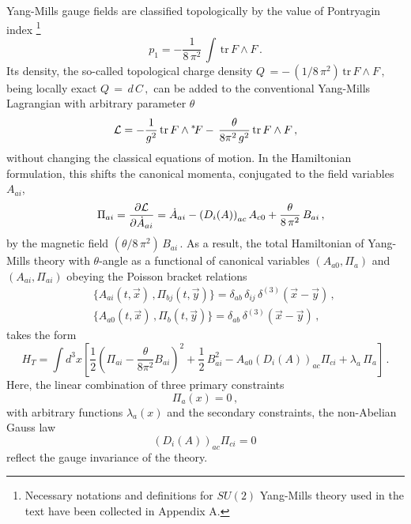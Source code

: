 \documentclass[a4paper,12pt]{article}
\begin{document}
Yang-Mills gauge fields are classified topologically by the
value of Pontryagin index
\footnote{Necessary notations and definitions for $SU(2)$ Yang-Mills
theory used in the text have been collected in Appendix A.}
\begin{equation}
p_1 = - \frac{1}{8 \, \pi^2} \, \int \, \mbox{tr} \, F \wedge F \,.
\end{equation}
Its density, the so-called topological charge density
$
Q\, = -\, (1/ 8 \, \pi^2)\, \mbox{tr} \, F \wedge F\,,
$
being locally exact
$ Q \, = \, d\,C\,, $
can be added to the conventional Yang-Mills Lagrangian
with arbitrary parameter $\theta$
\begin{equation}
\label{eq:Lagr}
{\cal L}  =  - \frac{1}{g^2}  \, \mbox{tr} \, F \wedge {}^\ast\! F -
\, \frac{\theta}{8\pi^2\, g^2} \, \mbox{tr} \, F \wedge F \,,
\end{equation}
without changing the classical equations of motion.
In the Hamiltonian formulation, this
shifts the canonical momenta,
conjugated to the field variables $A_{ai}$,
\begin{eqnarray} \label{eq:mom}
&&  \Pi_{ai} =
\frac{ \partial{\cal L} }{\partial {\dot A}_{ai} } =
{\dot A}_{ai} - \left( D_i (A) \right)_{ac} A_{c0} +
\frac{\theta}{8 \, \pi^2} \, B_{ai}\,,
\end{eqnarray}
by the magnetic field $(\theta /8 \, \pi^2) \, B_{ai}\,$.
As a result, the total  Hamiltonian \cite{DiracL,HenTeit}
of Yang-Mills theory with $\theta$-angle as a functional
of canonical variables $(A_{a0}, \Pi_a)$ and  $(A_{ai}, \Pi_{ai})$
obeying the Poisson bracket relations
\begin{eqnarray} \label{eq:pbo}
&&
\{ A_{ai}(t, \vec{x})\, ,\Pi_{bj}(t, \vec{y}) \} =
\delta_{ab}\, \delta_{ij}\, \delta^{(3)}(\vec{x} - \vec{y})\,,\\
&&
\{ A_{a0}(t, \vec{x})\,,\Pi_{b}(t, \vec{y}) \} =
\delta_{ab}\, \delta^{(3)}(\vec{x} - \vec{y})\,,
\end{eqnarray}
takes the form
\begin{equation} \label{eq:tothamn}
H_T = \int d^3 x \left[
\frac{1}{2}\left( \Pi_{ai} - \frac{\theta}{8\pi^2} B_{ai}\right)^2 +
\frac{1}{2}\, B_{ai}^2 - A_{a0} \left(D_i(A)\right)_{ac} \Pi_{ci}
+ \lambda_a \, \Pi_a
 \right]\,.
\end{equation}
Here, the linear combination of three primary constraints
\begin{equation}
\label{primconst}
\Pi_a (x) = 0\,,
\end{equation}
with arbitrary functions $\lambda_a(x)$
and the secondary constraints, the non-Abelian Gauss law
\begin{equation}
 \label{eq:secconstr}
\left(D_i(A)\right)_{ac} \Pi_{ci} = 0 \,
\end{equation}
reflect the gauge invariance of the theory.
\end{document}
